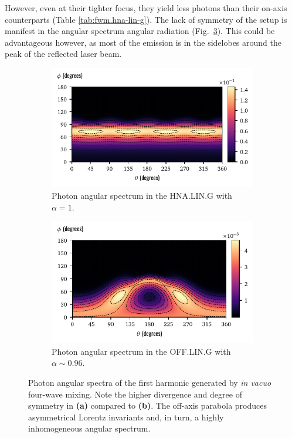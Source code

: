 \documentclass[11pt,SymmetricalJury]{inrsthesis/inrsthesis}
\begin{document}
However, even at their tighter focus, they yield less photons than their on-axis
counterparts (Table \ref{tab:fwm.hna-lin-g}). The lack of symmetry of the setup
is manifest in the angular spectrum angular radiation (Fig.~\ref{fig:fwm.hna-vs-off}).
This could be advantageous however, as most of the emission is in the sidelobes around
the peak of the reflected laser beam.

\begin{figure}
  \centering
  \begin{subfigure}{0.49\textwidth}
    \centering
    \includegraphics[width=\textwidth]{figs/fwm_hna1_angspec_f_cont.pdf}
    \caption{Photon angular spectrum in the HNA.LIN.G with $\alpha=1$.}
    \label{fig:fwm.hna-lin-g-1.0}
  \end{subfigure}
  \hfill
  \begin{subfigure}{0.49  \textwidth}
    \centering
    \includegraphics[width=\textwidth]{figs/fwm_off1_angspec_f_cont.pdf}
    \caption{Photon angular spectrum in the OFF.LIN.G with $\alpha\sim0.96$.}
    \label{fig:fwm.off-lin-g-0.96}
  \end{subfigure}
  \caption[Angular spectra of the first harmonic photons generated by \textit{in vacuo} FWM.]
          {Photon angular spectra of the first harmonic generated by
          \textit{in vacuo} four-wave mixing. Note the higher divergence
          and degree of symmetry in \textbf{(a)} compared to \textbf{(b)}.
          The off-axis parabola produces asymmetrical Lorentz invariants and,
          in turn, a highly inhomogeneous angular spectrum.}
  \label{fig:fwm.hna-vs-off}
\end{figure}
\end{document}

